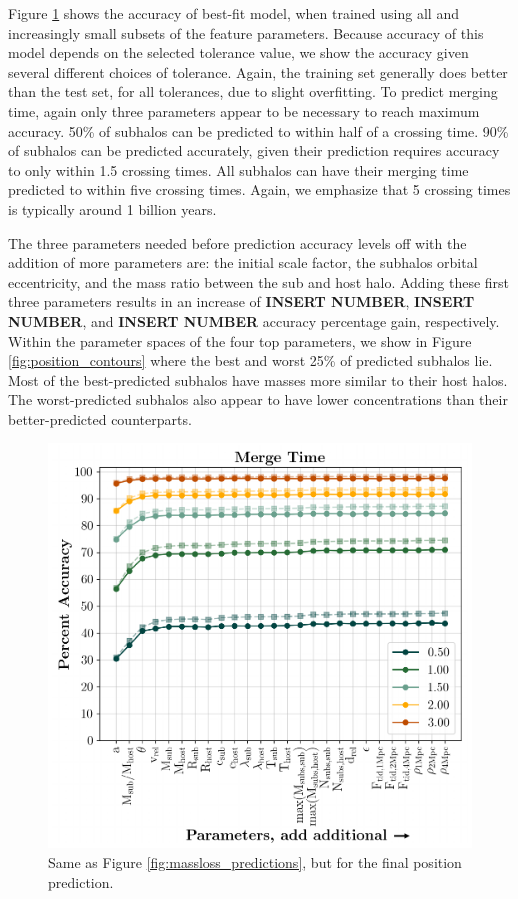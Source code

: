 \documentclass[fleqn,usenatbib]{mnras}
\begin{document}
Figure \ref{fig:time_predictions} shows the accuracy of best-fit model, when trained using all and increasingly small subsets of the feature parameters. Because accuracy of this model depends on the selected tolerance value, we show the accuracy given several different choices of tolerance. Again, the training set generally does better than the test set, for all tolerances, due to slight  overfitting. To predict merging time, again only three parameters appear to be necessary to reach maximum accuracy. 50\% of subhalos can be predicted to within half of a crossing time. 90\% of subhalos can be predicted accurately, given their prediction requires accuracy to only within 1.5 crossing times. All subhalos can have their merging time predicted to within five crossing times. Again, we emphasize that 5 crossing times is typically around 1 billion years.

The three parameters needed before prediction accuracy levels off with the addition of more parameters are: the initial scale factor, the subhalos orbital eccentricity, and the mass ratio between the sub and host halo. Adding these first three parameters results in an increase of \textbf{INSERT NUMBER}, \textbf{INSERT NUMBER}, and  \textbf{INSERT NUMBER} accuracy percentage gain, respectively. Within the parameter spaces of the four top parameters, we show in Figure \ref{fig:position_contours} where the best and worst 25\% of predicted subhalos lie. Most of the best-predicted subhalos have masses more similar to their host halos. The worst-predicted subhalos also appear to have lower concentrations than their better-predicted counterparts. 

\begin{figure}
	\includegraphics[width=\columnwidth]{Figures/time_predictions}
    \caption{Same as Figure \ref{fig:massloss_predictions}, but for the final position prediction.}
    \label{fig:time_predictions}
\end{figure}
\end{document}
